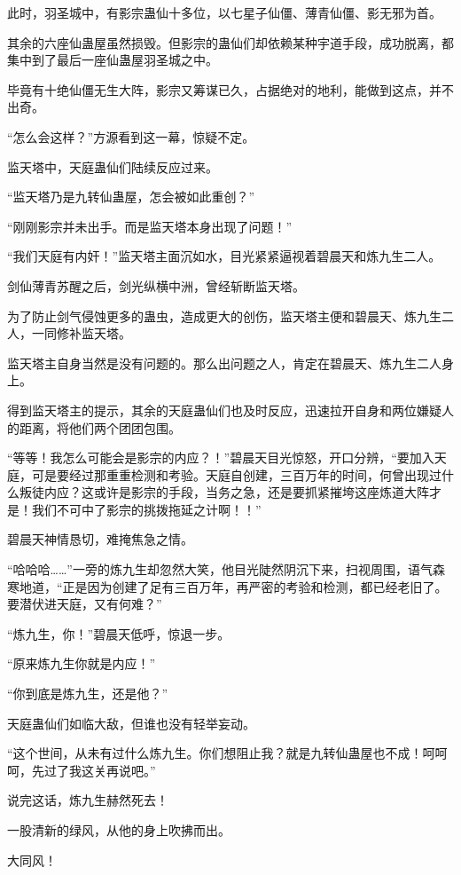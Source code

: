 \begin{this_body}
此时，羽圣城中，有影宗蛊仙十多位，以七星子仙僵、薄青仙僵、影无邪为首。

其余的六座仙蛊屋虽然损毁。但影宗的蛊仙们却依赖某种宇道手段，成功脱离，都集中到了最后一座仙蛊屋羽圣城之中。

毕竟有十绝仙僵无生大阵，影宗又筹谋已久，占据绝对的地利，能做到这点，并不出奇。

“怎么会这样？”方源看到这一幕，惊疑不定。

监天塔中，天庭蛊仙们陆续反应过来。

“监天塔乃是九转仙蛊屋，怎会被如此重创？”

“刚刚影宗并未出手。而是监天塔本身出现了问题！”

“我们天庭有内奸！”监天塔主面沉如水，目光紧紧逼视着碧晨天和炼九生二人。

剑仙薄青苏醒之后，剑光纵横中洲，曾经斩断监天塔。

为了防止剑气侵蚀更多的蛊虫，造成更大的创伤，监天塔主便和碧晨天、炼九生二人，一同修补监天塔。

监天塔主自身当然是没有问题的。那么出问题之人，肯定在碧晨天、炼九生二人身上。

得到监天塔主的提示，其余的天庭蛊仙们也及时反应，迅速拉开自身和两位嫌疑人的距离，将他们两个团团包围。

“等等！我怎么可能会是影宗的内应？！”碧晨天目光惊怒，开口分辨，“要加入天庭，可是要经过那重重检测和考验。天庭自创建，三百万年的时间，何曾出现过什么叛徒内应？这或许是影宗的手段，当务之急，还是要抓紧摧垮这座炼道大阵才是！我们不可中了影宗的挑拨拖延之计啊！！”

碧晨天神情恳切，难掩焦急之情。

“哈哈哈……”一旁的炼九生却忽然大笑，他目光陡然阴沉下来，扫视周围，语气森寒地道，“正是因为创建了足有三百万年，再严密的考验和检测，都已经老旧了。要潜伏进天庭，又有何难？”

“炼九生，你！”碧晨天低呼，惊退一步。

“原来炼九生你就是内应！”

“你到底是炼九生，还是他？”

天庭蛊仙们如临大敌，但谁也没有轻举妄动。

“这个世间，从未有过什么炼九生。你们想阻止我？就是九转仙蛊屋也不成！呵呵呵，先过了我这关再说吧。”

说完这话，炼九生赫然死去！

一股清新的绿风，从他的身上吹拂而出。

大同风！


\end{this_body}
